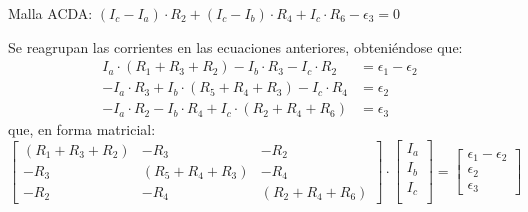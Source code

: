 \begin{example}
\begin{enumerate}
            Malla ACDA:
            $(I_c - I_a) \cdot R_2 + (I_c - I_b) \cdot R_4 + I_c \cdot
            R_6 - \epsilon_3 = 0$
			
            Se reagrupan las corrientes en las ecuaciones anteriores,
            obteniéndose que:
            \begin{align*}
              I_a \cdot (R_1 + R_3 + R_2)  - I_b\cdot R_3 - I_c \cdot R_2 &= \epsilon_1 - \epsilon_2\\
              - I_a \cdot R_3 + I_b \cdot (R_5 + R_4 + R_3) - I_c \cdot R_4 &=  \epsilon_2\\
              - I_a \cdot R_2 - I_b \cdot R_4 + I_c \cdot (R_2 + R_4 + R_6) &= \epsilon_3
            \end{align*}
            que, en forma matricial:
            \begin{equation*}
              \begin{bmatrix}
                (R_1 + R_3 + R_2) &  - R_3 & - R_2 \\
                - R_3 & (R_5 + R_4 + R_3) & - R_4 \\
                - R_2 & - R_4 &  (R_2 + R_4 + R_6)
              \end{bmatrix} \cdot %
              \begin{bmatrix}
                I_a\\
                I_b\\
                I_c\\
              \end{bmatrix} = %
              \begin{bmatrix}
                \epsilon_1 - \epsilon_2\\
                \epsilon_2\\
                \epsilon_3
              \end{bmatrix}
            \end{equation*}
          \end{enumerate}
	\end{example}
	
